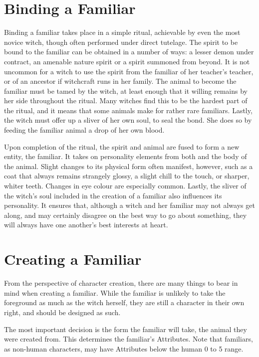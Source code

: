 \section{Binding a Familiar}

Binding a familiar takes place in a simple ritual, achievable by even the most novice witch, though often performed under direct tutelage.
The spirit to be bound to the familiar can be obtained in a number of ways: a lesser demon under contract, an amenable nature spirit or a spirit summoned from beyond.
It is not uncommon for a witch to use the spirit from the familiar of her teacher's teacher, or of an ancestor if witchcraft runs in her family.
The animal to become the familiar must be tamed by the witch, at least enough that it willing remains by her side throughout the ritual.
Many witches find this to be the hardest part of the ritual, and it means that some animals make for rather rare familiars.
Lastly, the witch must offer up a sliver of her own soul, to seal the bond.
She does so by feeding the familiar animal a drop of her own blood.

Upon completion of the ritual, the spirit and animal are fused to form a new entity, the familiar.
It takes on personality elements from both and the body of the animal.
Slight changes to its physical form often manifest, however, such as a coat that always remains strangely glossy, a slight chill to the touch, or sharper, whiter teeth.
Changes in eye colour are especially common.
Lastly, the sliver of the witch's soul included in the creation of a familiar also influences its personality.
It ensures that, although a witch and her familiar may not always get along, and may certainly disagree on the best way to go about something, they will always have one another's best interests at heart.

\section{Creating a Familiar}

From the perspective of character creation, there are many things to bear in mind when creating a familiar.
While the familiar is unlikely to take the foreground as much as the witch herself, they are still a character in their own right, and should be designed as such.

The most important decision is the form the familiar will take, the animal they were created from.
This determines the familiar's Attributes.
Note that familiars, as non-human characters, may have Attributes below the human 0 to 5 range.

